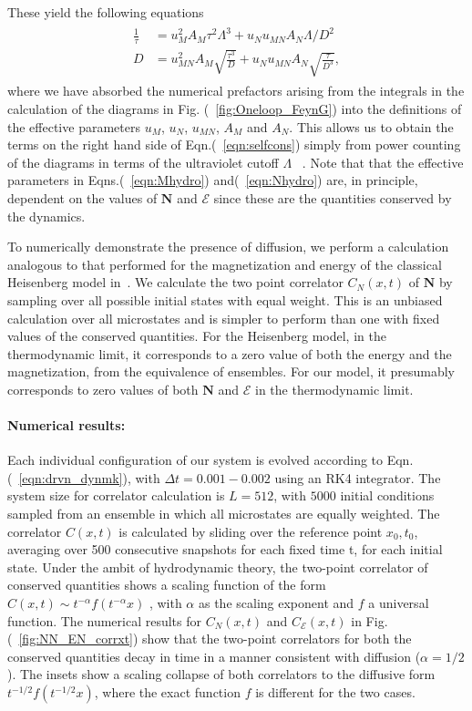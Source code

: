 \documentclass[prl,aps,twocolumn,nosuperscriptaddress,bibnotes,notitlepage,nofootinbib]{revtex4-2}
\newcommand{\stagg}{\mathbf{N}}
\begin{document}
These yield the following equations~\cite{Suppinf}
\begin{align}
    \begin{split}
\frac{1}{\tau} &= u_M^2A_M\tau^2\Lambda^3 + u_N u_{MN}A_N\Lambda/D^2 \\
D & = u_{MN}^2A_M\sqrt{\frac{\tau^3}{D}} + u_Nu_{MN}A_N \sqrt{\frac{\tau}{D^3}},
    \end{split}
    \label{eqn:selfcons}
\end{align}
where we have absorbed the numerical prefactors arising from the integrals in the calculation of the diagrams in Fig. (~\ref{fig:Oneloop_FeynG}) into the definitions of the effective parameters $u_M$, $u_N$, $u_{MN}$, $A_M$ and $A_N$. This allows us to obtain the terms on the right hand side of Eqn.(~\ref{eqn:selfcons}) simply from power counting of the diagrams in terms of the ultraviolet cutoff $\Lambda$ ~\cite{Suppinf}. Note that that the effective parameters in Eqns.(~\ref{eqn:Mhydro}) and(~\ref{eqn:Nhydro}) are, in principle, dependent on the values of $\stagg$ and ${\mathcal{E}}$ since these are the quantities conserved by the dynamics. 

To numerically demonstrate the presence of diffusion, we perform a calculation analogous to that performed for the magnetization and energy of the classical Heisenberg model in~\cite{das2018light}. We calculate the two point correlator $C_{N}(x,t)$ of $\stagg$ by sampling over all possible initial states with equal weight. This is an unbiased calculation over all microstates and is simpler to perform than one with fixed values of the conserved quantities. For the Heisenberg model, in the thermodynamic limit, it corresponds to a zero value of both the energy and the magnetization, from the equivalence of ensembles. For our model, it presumably corresponds to zero values of both $\stagg$ and ${\mathcal{E}}$ in the thermodynamic limit. 

\paragraph{Numerical results:} Each individual configuration of our system is  evolved according to  Eqn.(~\ref{eqn:drvn_dynmk}), with $\Delta t = 0.001 - 0.002 $ using an RK4 integrator. The system size for correlator calculation is $L= 512$, with  $5000$ initial conditions sampled from an ensemble in which all microstates are equally weighted. The correlator $C(x,t)$ is calculated by sliding over the reference point $x_0,t_0$, averaging over 500 consecutive snapshots for each fixed time t, for each initial state.
Under the ambit of hydrodynamic theory, the two-point correlator of conserved quantities shows a scaling function of the form $C(x,t) \sim t^{-\alpha} f(t^{-\alpha}x)$ , with $\alpha$ as the scaling exponent and $f$ a universal function. The numerical results for $C_{N}(x,t)$ and $C_{\mathcal{E}}(x,t)$ in Fig. (~\ref{fig:NN_EN_corrxt}) show that the two-point correlators for both the conserved quantities decay in time in a manner consistent with diffusion ($\alpha = 1/2$). The insets show a scaling collapse of both correlators to the diffusive form $t^{-1/2} f(t^{-1/2}x)$, where the exact function $f$ is different for the two cases. 
\end{document}
